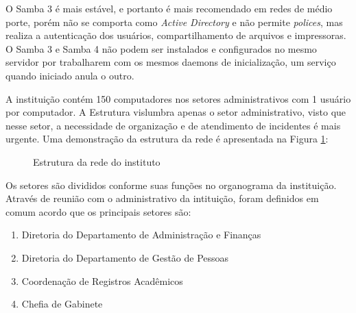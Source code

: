 O Samba 3 é mais estável, e portanto é mais recomendado em redes de médio porte, porém não se comporta como \textit{Active Directory} e não permite \textit{polices}, mas realiza a autenticação dos usuários, compartilhamento de arquivos e impressoras.
O Samba 3 e Samba 4 não podem ser instalados e configurados no mesmo servidor por trabalharem com os mesmos daemons de inicialização, um serviço quando iniciado anula o outro.


A instituição contém 150 computadores nos setores administrativos com 1 usuário por computador. A Estrutura vislumbra apenas o setor administrativo, visto que nesse setor, a necessidade de organização e de atendimento de incidentes é mais urgente. Uma demonstração da estrutura da rede é apresentada na Figura \ref{rede}:

\begin{figure}[h!]
   	\centering
   	\caption{Estrutura da rede do instituto}
    \label{rede}
\end{figure}
          				
Os setores são divididos conforme suas funções no organograma da instituição. Através de reunião com o administrativo da intituição, foram definidos em comum acordo que os principais setores são:

\begin{enumerate}
	\item{Diretoria do Departamento de Administração e Finanças}
	\item{Diretoria do Departamento de Gestão de Pessoas}
	\item{Coordenação de Registros Acadêmicos}
	\item{Chefia de Gabinete}
\end{enumerate}

